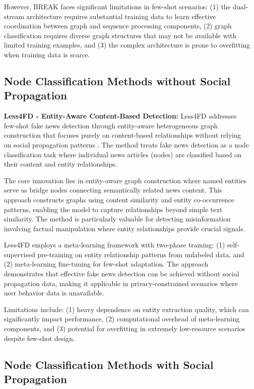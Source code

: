 However, BREAK faces significant limitations in few-shot scenarios: (1) the dual-stream architecture requires substantial training data to learn effective coordination between graph and sequence processing components, (2) graph classification requires diverse graph structures that may not be available with limited training examples, and (3) the complex architecture is prone to overfitting when training data is scarce.

\subsection{Node Classification Methods without Social Propagation}

\textbf{Less4FD - Entity-Aware Content-Based Detection:} Less4FD addresses few-shot fake news detection through entity-aware heterogeneous graph construction that focuses purely on content-based relationships without relying on social propagation patterns \cite{zhang2023less4fd}. The method treats fake news detection as a node classification task where individual news articles (nodes) are classified based on their content and entity relationships.

The core innovation lies in entity-aware graph construction where named entities serve as bridge nodes connecting semantically related news content. This approach constructs graphs using content similarity and entity co-occurrence patterns, enabling the model to capture relationships beyond simple text similarity. The method is particularly valuable for detecting misinformation involving factual manipulation where entity relationships provide crucial signals.

Less4FD employs a meta-learning framework with two-phase training: (1) self-supervised pre-training on entity relationship patterns from unlabeled data, and (2) meta-learning fine-tuning for few-shot adaptation. The approach demonstrates that effective fake news detection can be achieved without social propagation data, making it applicable in privacy-constrained scenarios where user behavior data is unavailable.

Limitations include: (1) heavy dependence on entity extraction quality, which can significantly impact performance, (2) computational overhead of meta-learning components, and (3) potential for overfitting in extremely low-resource scenarios despite few-shot design.

\subsection{Node Classification Methods with Social Propagation}

